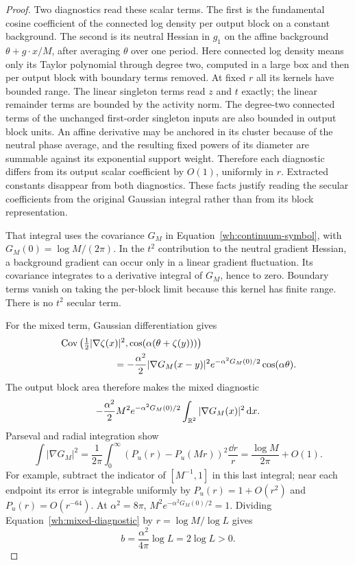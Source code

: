 \begin{proof}
Two diagnostics read these scalar terms.  The first is the
fundamental cosine coefficient of the connected log density per
output block on a constant background.  The second is its neutral
Hessian in $g_1$ on the affine background
$\theta+g\cdot x/M$, after averaging $\theta$ over one period.
Here connected log density means only its Taylor polynomial through
degree two, computed in a large box and then per output block with
boundary terms removed.  At fixed $r$ all its kernels have bounded
range.  The linear singleton terms read $z$ and $t$ exactly; the
linear remainder terms are bounded by the activity norm.  The
degree-two connected terms of the unchanged first-order singleton
inputs are also bounded in output block units.  An affine
derivative may be anchored in its cluster because of the neutral
phase average, and the resulting fixed powers of its diameter are
summable against its exponential support weight.  Therefore each
diagnostic differs from its output scalar coefficient by $O(1)$,
uniformly in $r$.  Extracted constants disappear from both
diagnostics.  These facts justify reading the secular coefficients
from the original Gaussian integral rather than from its block
representation.

That integral uses the covariance $G_M$ in
Equation~\eqref{wh:continuum-symbol}, with
$G_M(0)=\log M/(2\pi)$.  In the $t^2$ contribution to the neutral
gradient Hessian, a background gradient can occur only in a linear
gradient fluctuation.  Its covariance integrates to a derivative
integral of $G_M$, hence to zero.  Boundary terms vanish on taking
the per-block limit because this kernel has finite range.  There
is no $t^2$ secular term.

For the mixed term, Gaussian differentiation gives
\begin{align*}
 &\Cov\left(\tfrac12|\nabla\zeta(x)|^2,
              \cos(\alpha(\theta+\zeta(y)))\right)\\
 &\hspace{20mm}=-\frac{\alpha^2}{2}|\nabla G_M(x-y)|^2
       e^{-\alpha^2G_M(0)/2}\cos(\alpha\theta).
\end{align*}
The output block area therefore makes the mixed diagnostic
\begin{equation}\label{wh:mixed-diagnostic}
 -\frac{\alpha^2}{2}M^2e^{-\alpha^2G_M(0)/2}
               \int_{\mathbb R^2}|\nabla G_M(x)|^2\,\mathrm d x.
\end{equation}
Parseval and radial integration show
\[
 \int|\nabla G_M|^2
   =\frac1{2\pi}\int_0^\infty
                  (P_u(r)-P_u(Mr))^2\frac{\dd r}{r}
   =\frac{\log M}{2\pi}+O(1).
\]
For example, subtract the indicator of $[M^{-1},1]$ in this last
integral; near each endpoint its error is integrable uniformly by
$P_u(r)=1+O(r^2)$ and $P_u(r)=O(r^{-64})$.
At $\alpha^2=8\pi$, $M^2e^{-\alpha^2G_M(0)/2}=1$.
Dividing Equation~\eqref{wh:mixed-diagnostic} by
$r=\log M/\log L$ gives
\begin{equation}\label{wh:b-value}
 b=\frac{\alpha^2}{4\pi}\log L=2\log L>0.
\end{equation}


\end{proof}
